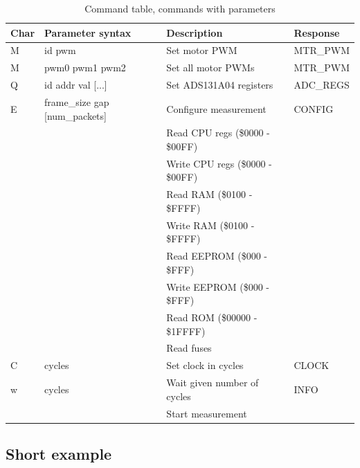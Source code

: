 \documentclass{article}
\begin{document}
\begin{table}[H]
\begin{centering}
\begin{tabular}{|p{0.8cm}|p{2.6cm}|p{4.9cm}|p{2.0cm}|}
\hline
{\bf Char} & {\bf Parameter syntax} & {\bf Description} & {\bf Response} \\ \hline
M & id pwm              & Set motor PWM                       & MTR\_PWM      \\ \hline
M & pwm0 pwm1 pwm2      & Set all motor PWMs                  & MTR\_PWM      \\ \hline
Q & id addr val [...]   & Set ADS131A04 registers             & ADC\_REGS     \\ \hline
E & frame\_size gap [num\_packets] & Configure measurement    & CONFIG        \\ \hline
  &                     & Read CPU regs (\$0000 - \$00FF)     &               \\ \hline
  &                     & Write CPU regs (\$0000 - \$00FF)    &               \\ \hline
  &                     & Read RAM (\$0100 - \$FFFF)          &               \\ \hline
  &                     & Write RAM (\$0100 - \$FFFF)         &               \\ \hline
  &                     & Read EEPROM (\$000 - \$FFF)         &               \\ \hline
  &                     & Write EEPROM (\$000 - \$FFF)        &               \\ \hline
  &                     & Read ROM (\$00000 - \$1FFFF)        &               \\ \hline
  &                     & Read fuses                          &               \\ \hline
C & cycles              & Set clock in cycles                 & CLOCK         \\ \hline
w & cycles              & Wait given number of cycles         & INFO          \\ \hline
  &                     & Start measurement                   &               \\ \hline
\end{tabular}
\caption{Command table, commands with parameters}
\label{command_table}
\end{centering}
\end{table}

\subsection{Short example}
\end{document}
